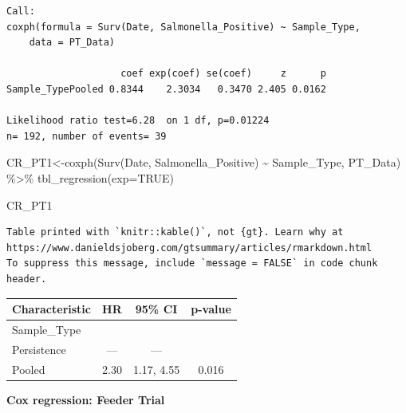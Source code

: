 \documentclass[
  letterpaper,
  DIV=11,
  numbers=noendperiod]{scrartcl}
\newenvironment{Shaded}{}{}
\newcommand{\AttributeTok}[1]{\textcolor[rgb]{0.84,0.23,0.29}{#1}}
\newcommand{\ConstantTok}[1]{\textcolor[rgb]{0.00,0.36,0.77}{#1}}
\newcommand{\FunctionTok}[1]{\textcolor[rgb]{0.44,0.26,0.76}{#1}}
\newcommand{\NormalTok}[1]{\textcolor[rgb]{0.14,0.16,0.18}{#1}}
\newcommand{\OtherTok}[1]{\textcolor[rgb]{0.44,0.26,0.76}{#1}}
\newcommand{\SpecialCharTok}[1]{\textcolor[rgb]{0.00,0.36,0.77}{#1}}
\begin{document}
\begin{verbatim}
Call:
coxph(formula = Surv(Date, Salmonella_Positive) ~ Sample_Type, 
    data = PT_Data)

                    coef exp(coef) se(coef)     z      p
Sample_TypePooled 0.8344    2.3034   0.3470 2.405 0.0162

Likelihood ratio test=6.28  on 1 df, p=0.01224
n= 192, number of events= 39 
\end{verbatim}

\begin{Shaded}
\begin{Highlighting}[]
\NormalTok{CR\_PT1}\OtherTok{\textless{}{-}}\FunctionTok{coxph}\NormalTok{(}\FunctionTok{Surv}\NormalTok{(Date, Salmonella\_Positive) }\SpecialCharTok{\textasciitilde{}}\NormalTok{ Sample\_Type, PT\_Data) }\SpecialCharTok{\%\textgreater{}\%}
  \FunctionTok{tbl\_regression}\NormalTok{(}\AttributeTok{exp=}\ConstantTok{TRUE}\NormalTok{)}

\NormalTok{CR\_PT1}
\end{Highlighting}
\end{Shaded}

\begin{verbatim}
Table printed with `knitr::kable()`, not {gt}. Learn why at
https://www.danieldsjoberg.com/gtsummary/articles/rmarkdown.html
To suppress this message, include `message = FALSE` in code chunk header.
\end{verbatim}

\begin{longtable}[]{@{}lccc@{}}
\toprule()
\textbf{Characteristic} & \textbf{HR} & \textbf{95\% CI} &
\textbf{p-value} \\
\midrule()
\endhead
Sample\_Type & & & \\
Persistence & --- & --- & \\
Pooled & 2.30 & 1.17, 4.55 & 0.016 \\
\bottomrule()
\end{longtable}

\textbf{Cox regression: Feeder Trial}

\begin{Shaded}
\end{Shaded}
\end{document}
